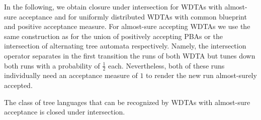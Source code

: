 In the following, we obtain closure under intersection for \acp{WDTA} with
almost-sure acceptance and for uniformly distributed \acp{WDTA} with common
blueprint and positive acceptance measure. For almost-sure accepting \acp{WDTA}
we use the same construction as for the union of positively accepting \acp{PBA}
or the intersection of alternating tree automata respectively. Namely, the
intersection operator separates in the first transition the runs of
both \ac{WDTA} but tunes down both runs with a probability of $\frac{1}{2}$
each. Nevertheless, both of these runs individually need an acceptance measure
of $1$ to render the new run almost-surely accepted.
\begin{proposition}
  The class of tree languages that can be recognized by \acp{WDTA} with
  almost-sure acceptance is closed under intersection.
\end{proposition}
